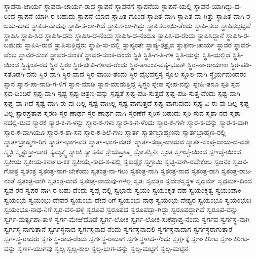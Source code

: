 ಸ್ಥಾಪನಾ-ಚಾರ್ಯ
ಸ್ಥಾಪನಾ-ಚಾರ್ಯ-ರಾದ
ಸ್ಥಾಪನೆ
ಸ್ಥಾಪನೆಗೆ
ಸ್ಥಾಪನೆಯ
ಸ್ಥಾಪನೆ-ಯಲ್ಲಿ
ಸ್ಥಾಪನೆ-ಯಾಗಿದ್ದು-ದ-ರಿಂದ
ಸ್ಥಾಪನೆ-ಯಾಗಿ-ರ-ಬಹುದು
ಸ್ಥಾಪನೆ-ಯಾದ
ಸ್ಥಾಪಿತ-ಗೊಂಡ
ಸ್ಥಾಪಿತ-ವಾಗಿ
ಸ್ಥಾಪಿತ-ವಾ-ಗಿತ್ತು
ಸ್ಥಾಪಿತ-ವಾಗಿ-ರ-ಬಹು-ದಾದ
ಸ್ಥಾಪಿತ-ವಾದವು
ಸ್ಥಾಪಿ-ಸ-ಲಾ-ಗಿದೆ
ಸ್ಥಾಪಿಸ-ಲಾ-ಗಿದ್ದು
ಸ್ಥಾಪಿಸಲಾಯಿ-ತೆಂದು
ಸ್ಥಾಪಿ-ಸಲು
ಸ್ಥಾಪಿಸಲ್ಪಟ್ಟಿವೆ
ಸ್ಥಾಪಿಸಿ
ಸ್ಥಾಪಿ-ಸಿದ
ಸ್ಥಾಪಿಸಿ-ದನು
ಸ್ಥಾಪಿಸಿ-ದ-ನೆಂದು
ಸ್ಥಾಪಿಸಿ-ದ-ನೆಂದೂ
ಸ್ಥಾಪಿಸಿ-ದ-ರೆಂದು
ಸ್ಥಾಪಿಸಿದ್ದಾನೆ
ಸ್ಥಾಪಿಸಿ-ರ-ಬಹುದು
ಸ್ಥಾಪಿಸಿ-ರುವ
ಸ್ಥಾಪಿಸುತ್ತಿದ್ದರು
ಸ್ಥಾಪಿ-ಸು-ವಲ್ಲಿ
ಸ್ಥಾಪ್ಯಂತೇ
ಸ್ಥಾಪ್ಯ-ತತ್ರೈವ
ಸ್ಥಾಫನಾ-ಚಾರ್ಯ
ಸ್ಥಾವರ
ಸ್ಥಾವರ-ವೆಂಬ
ಸ್ಥಾವರ-ಸುಂಕ
ಸ್ಥಾವರ-ಸುಂಕಕೆ
ಸ್ಥಾವರ-ಸುಂಕ-ವೆಂದು
ಸ್ಥಿತಿ
ಸ್ಥಿತಿ-ಗ-ತಿ-ಗಳ
ಸ್ಥಿತಿ-ಯನ್ನು
ಸ್ಥಿತಿ-ಯಲ್ಲಿದೆ
ಸ್ಥಿತಿ-ಯಿಂದ
ಸ್ಥಿತ್ಯಂತ-ರದ
ಸ್ಥಿರ
ಸ್ಥಿರಂ
ಸ್ಥಿರ-ಜೀವಿ-ಗಳಾದ-ರೆಂದು
ಸ್ಥಿರ-ತಾಟಂಕ-ವತ್ಯ-ಭೂತ್
ಸ್ಥಿರ-ನಾ-ರಾಯಣಂ
ಸ್ಥಿರ-ಪಡಿ-ಸತೊಡಗಿ-ದನು
ಸ್ಥಿರ-ವಾಗಿ
ಸ್ಥಿರ-ವಾದ
ಸ್ಥಿರ-ವಾಯಿ-ತೆಂದು
ಸ್ಥಿರ-ವೈಭವಸ್ತಸ್ಯ
ಸ್ಥೂಲ
ಸ್ಥೂಲ-ವಾಗಿ
ಸ್ಥೈರ್ಯಮಂದರಂ
ಸ್ನಾನ
ಸ್ನಾನ-ಪಾ-ನಾದಿ-ಗ-ಳಿಗೆ
ಸ್ನಾನ-ಮಾಡಿ
ಸ್ನಾನ-ಮಾಡುತ್ತಿದ್ದ
ಸ್ನಿಗ್ಧಂ
ಸ್ನೇಹ
ಸ್ನೇಹ-ವನ್ನು
ಸ್ನೇಹಿ-ತನೂ
ಸ್ಪತಿ
ಸ್ಪದ
ಸ್ಪದ-ದಿಂದಿರೆ
ಸ್ಪಪ್ಟ-ವಾಗಿ
ಸ್ಪಷ್ಟ
ಸ್ಪಷ್ಟ-ಚಿತ್ರಣ-ವನ್ನು
ಸ್ಪಷ್ಟತೆ
ಸ್ಪಷ್ಟ-ಪಡಿ-ಸುತ್ತದೆ
ಸ್ಪಷ್ಟ-ಪಡಿ-ಸುತ್ತ-ದೆಂದು
ಸ್ಪಷ್ಟ-ವಾಗಿ
ಸ್ಪಷ್ಟ-ವಾ-ಗಿದೆ
ಸ್ಪಷ್ಟ-ವಾಗಿ-ರು-ವು-ದಿಲ್ಲ
ಸ್ಪಷ್ಟ-ವಾಗಿಲ್ಲ
ಸ್ಪಷ್ಟ-ವಾಗುತ್ತದೆ
ಸ್ಪಷ್ಟ-ವಾಗುವುದು
ಸ್ಪಷ್ಟ-ವಿ-ರು-ವು-ದಿಲ್ಲ
ಸ್ಪಷ್ಟ-ವಿಲ್ಲ
ಸ್ಫಾರಪ್ರತಾಪ
ಸ್ಮರಣ
ಸ್ಮರ-ಣಾರ್ಥ
ಸ್ಮರ-ಣಾರ್ಥ-ವಾಗಿ
ಸ್ಮರಣೆಗೆ
ಸ್ಮರಿಸ-ಬಹುದು
ಸ್ಮರಿ-ಸುವ
ಸ್ಮಶಾ-ನದ
ಸ್ಮಶಾ-ನದಲ್ಲಿ-ರುವ
ಸ್ಮಾರಕ
ಸ್ಮಾರ-ಕ-ಗ-ಳನ್ನು
ಸ್ಮಾರ-ಕ-ಗಳು
ಸ್ಮಾರ-ಕ-ಗ-ಳೆಂದು
ಸ್ಮಾರ-ಕ-ಗಳೇ
ಸ್ಮಾರ-ಕ-ವನ್ನು
ಸ್ಮಾರ-ಕ-ವಾಗಿ
ಸ್ಮಾರ-ಕ-ವಾಗಿಯೂ
ಸ್ಮಾರ-ಕ-ಶಾ-ಸನ
ಸ್ಮಾರ-ಕ-ಶಿಲೆ-ಗಳು
ಸ್ಮಾರ್ತ
ಸ್ಮಾರ್ತಬ್ರಾಹ್ಮಣನು
ಸ್ಮಾರ್ತಬ್ರಾಹ್ಮಣ-ರಲ್ಲಿ
ಸ್ಮಾರ್ತಬ್ರಾಹ್ಮಣ-ರಿಗೆ
ಸ್ಮಾರ್ತ-ಭಾಗ-ವತ
ಸ್ಮಾರ್ತ-ಭಾಗ-ವತರೇ
ಸ್ಮಾರ್ತ-ಸಂಪ್ರ-ದಾಯದ
ಸ್ಮಾರ್ತ-ಸಂಪ್ರ-ದಾಯ-ದ-ವರೇ
ಸ್ಮೃತಿ
ಸ್ಮೃತ್ಯುಕ್ತಾ-ಚಾರ
ಸ್ಯಮ್ಯಕ್ತ್ವ
ಸ್ಯಾಂಕಿ
ಸ್ಯಾಸನವ
ಸ್ರೇಯಪ್ರಾಪ್ತ
ಸ್ರೋತಸ್ವಿನೀ
ಸ್ವಂತ
ಸ್ವಇಚ್ಚೆ-ಯಿಂದ
ಸ್ವಇಚ್ಛೆ-ಯಿಂದ
ಸ್ವಕೀಯ
ಸ್ವಕೀಯ-ಕರ್ನಾಟ-ಕಕ
ಸ್ವಕೀಯೈ-ಕಾದ-ಶ-ಪಲ್ಲಿ
ಸ್ವಖಡ್ಗೈಕ
ಸ್ವಗ್ರಾಮಿ
ಸ್ವಚ್ಛ-ವಾಗಿ-ರಬೇಕೆಂಬ
ಸ್ವಜನಂ
ಸ್ವಜನ-ಗೋತ್ರ
ಸ್ವತಂತ್ರ
ಸ್ವತಂತ್ರ-ನಾಗ-ಬೇಕೆಂದು
ಸ್ವತಂತ್ರ-ನಾ-ಗಲು
ಸ್ವತಂತ್ರ-ನಾಗಿ
ಸ್ವತಂತ್ರ-ನಾದ
ಸ್ವತಂತ್ರ-ರಾಗಿ
ಸ್ವತಂತ್ರ-ರಾಜ-ನಂತೆ
ಸ್ವತಂತ್ರ-ವಾಗಿ
ಸ್ವತಂತ್ರ-ವಾದ
ಸ್ವತಂತ್ರ-ವಾದುವು-ಗಳಲ್ಲ
ಸ್ವತಃ
ಸ್ವದತ್ತಂ
ಸ್ವದೇಶಸ್ವಸ್ಥಳ
ಸ್ವಧರ್ಮ
ಸ್ವಧರ್ಮ-ದಿಂದ
ಸ್ವಪ-ರನ
ಸ್ವಪರ-ನಾಗಿ-ರ-ಬಹು-ದೆಂದು
ಸ್ವಪ್ನ-ದಲ್ಲಿ
ಸ್ವಭಾನು
ಸ್ವಯಂ
ಸ್ವಯಂಕೃತ-ವಹ
ಸ್ವಯಂಕೃತ್ವ
ಸ್ವಯಂಪಾಕಿ
ಸ್ವಯಂಭು
ಸ್ವಯಂಭು-ದೇವರ
ಸ್ವಯಂಭು-ದೇವ-ರಿಗೆ
ಸ್ವಯಂಭು-ನಾಥ
ಸ್ವಯಂಭು-ವೇಶ್ವರ
ಸ್ವಯಂಭೂ
ಸ್ವಯಂಭೂಃ
ಸ್ವಯಂಭೂ-ನಾಥ-ನಿಗೆ
ಸ್ವರ-ವನ-ಹಳ್ಳಿ
ಸ್ವರೂಪ
ಸ್ವರೂಪದ
ಸ್ವರೂಪದ್ದಾ-ಗಿದ್ದು
ಸ್ವರೂಪದ್ದಾಗಿವೆ
ಸ್ವರೂಪ-ವನ್ನು
ಸ್ವರ್ಗ-ಮರ್ತ್ಯಪಾ-ತಾಳ
ಸ್ವರ್ಗ-ಮೇಱಿದೊಡೆ
ಸ್ವರ್ಗ-ಲೋಕ
ಸ್ವರ್ಗ-ಲೋಕ-ಸುಕಪ್ರಾಪ್ತ-ನೆಂದು
ಸ್ವರ್ಗವ
ಸ್ವರ್ಗಸ್ಥ-ನಾಗಿ
ಸ್ವರ್ಗಸ್ಥ-ನಾಗುತ್ತಾನೆ
ಸ್ವರ್ಗಸ್ಥನಾದ
ಸ್ವರ್ಗಸ್ಥನಾದ-ನೆಂದು
ಸ್ವರ್ಗಸ್ಥನಾದಲಿ
ಸ್ವರ್ಗಸ್ಥನಾದಾಗ
ಸ್ವರ್ಗಸ್ಥರಾಗುತ್ತಾರೆ
ಸ್ವರ್ಗಸ್ಥ-ರಾದರು
ಸ್ವರ್ಗಸ್ಥ-ರಾದ-ರೆಂದು
ಸ್ವರ್ಗಸ್ಥ-ರಾದಾಗ
ಸ್ವರ್ಗಸ್ಥಳಾದ-ಳೆಂದು
ಸ್ವರ್ಗ್ಗಕ್ಕೆ
ಸ್ವರ್ಣಕಿರೀಟ
ಸ್ವರ್ಣಕಿರೀಟ-ವನ್ನು
ಸ್ವರ್ಣ-ಯುಗವು
ಸ್ವಲ್ಪ
ಸ್ವಲ್ಪ-ಕಾಲ
ಸ್ವಲ್ಪ-ಭಾಗ-ವನ್ನು
ಸ್ವಲ್ಪ-ಮಟ್ಟಿಗೆ
ಸ್ವಲ್ಪ-ಮಟ್ಟಿನ
